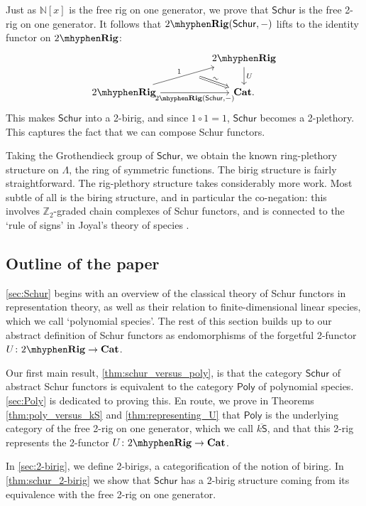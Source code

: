 \documentclass[12pt,reqno]{amsart}
\theoremstyle{plain}
\theoremstyle{definition}
\theoremstyle{remark}
\newcommand{\maps}{\colon}
\newcommand{\category}[1]{\mathsf{#1}}
\newcommand{\N}{\mathbb N}
\renewcommand{\S}{\category S}
\newcommand{\Z}{\mathbb Z}
\newcommand{\namedcat}[1]{\mathsf{#1}}
\newcommand{\Poly}{\namedcat{Poly}}
\newcommand{\Schur}{\namedcat{Schur}}
\newcommand{\TRig}{2\mhyphen\namedbicat{Rig}}
\newcommand{\namedbicat}[1]{\mathbf{#1}}
\newcommand{\CCat}{\namedbicat{Cat}}
\newcommand{\ksbar}{\overline{k\S}}
\numberwithin{thm}{section}
\begin{document}
Just as $\N[x]$ is the free rig on one generator, we prove that $\Schur$ is the free 2-rig on one generator. It follows that $\TRig(\Schur, -)$ lifts to the identity functor on $\TRig$:
\[
\begin{tikzcd}[column sep = huge]
    &
    \TRig
    \arrow[d, "U"]
    \\
    \TRig
    \arrow[ur, "1"]
    \arrow[ur, swap, ""{name = phi}, phantom, bend right = 5, pos = 0.6]
    \arrow[r, swap, "{\TRig(\Schur, -)}"]
    \arrow[from = phi, r, Rightarrow, "\sim", sloped]
    &
    \CCat.
\end{tikzcd}
\] 
This makes $\Schur$ into a 2-birig, and since $1 \circ 1 = 1$, $\Schur$ becomes a 2-plethory. This captures the fact that we can compose Schur functors. 

Taking the Grothendieck group of $\Schur$, we obtain the known ring-plethory structure on $\Lambda$, the ring of symmetric functions. The birig structure is fairly straightforward. The rig-plethory structure takes considerably more work. Most subtle of all is the biring structure, and in particular the co-negation: this involves  $\Z_2$-graded chain complexes of Schur functors, and is connected to the `rule of signs' in Joyal's theory of species \cite{Especies}. 

\subsection*{Outline of the paper}

\cref{sec:Schur} begins with an overview of the classical theory of Schur functors in representation theory, as well as their relation to finite-dimensional linear species, which we call `polynomial species'. The rest of this section builds up to our abstract definition of Schur functors as endomorphisms of the forgetful 2-functor $U \maps \TRig \to \CCat$. 

Our first main result, \cref{thm:schur_versus_poly}, is that the category $\Schur$ of abstract Schur functors is equivalent to the category $\Poly$ of polynomial species. \cref{sec:Poly} is dedicated to proving this.  En route, we prove in Theorems  \ref{thm:poly_versus_kS} and \ref{thm:representing_U} that $\Poly$ is the underlying category of the free 2-rig on one generator, which we call $\ksbar$, and that this 2-rig represents the 2-functor $U \maps \TRig \to \CCat$.

In \cref{sec:2-birig}, we define 2-birigs, a categorification of the notion of biring. In \cref{thm:schur_2-birig} we show that $\Schur$ has a 2-birig structure coming from its equivalence with the free 2-rig on one generator.
\end{document}
